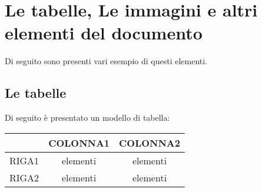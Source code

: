 \section{Le tabelle, Le immagini e altri elementi del documento}

Di seguito sono presenti vari esempio di questi elementi.

\subsection{Le tabelle}

Di seguito è presentato un modello di tabella:

\begin{center}
	\begin{tabular}{c|c c}
		\hline \hline
		& COLONNA1&COLONNA2\\
		\hline \hline
		RIGA1& elementi & elementi\\
		RIGA2& elementi & elementi\\
		\hline
	\end{tabular}
\end{center}
